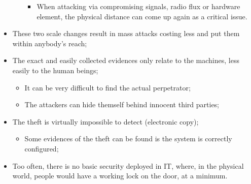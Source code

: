 \documentclass[11pt]{article} %
\begin{document}
\begin{itemize}
\begin{itemize}
\begin{itemize}
\item When attacking via compromising signals, radio flux or hardware element, 
the physical distance can come up again as a critical issue.
		\end{itemize}
	\end{itemize}
\item These two scale changes result in mass attacks costing less and put them
within anybody's reach;
\item The exact and easily collected evidences only relate to the machines, less easily to the human beings;
	\begin{itemize}
	\item It can be very difficult to find the actual perpetrator;
	\item The attackers can hide themself behind innocent third parties;
	\end{itemize}
\item The theft is virtually impossible to detect (electronic copy);
	\begin{itemize}
\item Some evidences of the theft can be found is the system is correctly configured;
	\end{itemize}
\item Too often, there is no basic security deployed in IT, where, in the physical world, 
people would have a working lock on the door, at a minimum.
\end{itemize}
\end{document}
